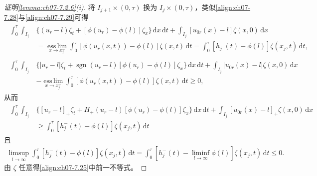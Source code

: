 \documentclass[../../main.tex]{subfiles}%
\begin{document}
\begin{proof}[证明\cref{lemma:ch07-7.2.6}(i)]
将 $I_{j+1}\times(0,\tau)$ 换为 $I_j\times(0,\tau)$，类似\eqref{align:ch07-7.28}与\eqref{align:ch07-7.29}可得
\begin{align}
\begin{aligned}
\int_0^\tau\int_{I_j}&\{(u_r-l)\zeta_t+[\phi(u_r)-\phi(l)]\zeta_x\}\,\mathrm{d}x\,\mathrm{d}t
+\int_{I_j}[u_{0r}(x)-l]\zeta(x,0)\,\mathrm{d}x\\
&=\operatorname*{ess\,lim}_{x\to x_j^-}\int_0^\tau[\phi(u_r(x,t))-\phi(l)]\zeta(x,t)\,\mathrm{d}t
=\int_0^\tau[h_j^-(t)-\phi(l)]\zeta(x_j,t)\,\mathrm{d}t,
\end{aligned} \label{align:ch07-7.30}
\end{align}
\begin{align}
\begin{aligned}
\int_0^\tau\int_{I_j}&\{|u_r-l|\zeta_t+\operatorname{sgn}(u_r-l)[\phi(u_r)-\phi(l)]\zeta_x\}\,\mathrm{d}x\,\mathrm{d}t
+\int_{I_j}|u_{0r}(x)-l|\zeta(x,0)\,\mathrm{d}x\\
&-\operatorname*{ess\,lim}_{x\to x_j^-}\int_0^\tau[\phi(u_r(x,t))-\phi(l)]\zeta(x,t)\,\mathrm{d}t\geqslant0,
\end{aligned} \label{align:ch07-7.31}
\end{align}
从而
\begin{align*}
\begin{aligned}
\int_0^\tau\int_{I_j}&\{[u_r-l]_+\zeta_t+H_+(u_r-l)[\phi(u_r)-\phi(l)]\zeta_x\}\,\mathrm{d}x\,\mathrm{d}t
+\int_{I_j}[u_{0r}(x)-l]_+\zeta(x,0)\,\mathrm{d}x\\
&\geqslant\int_0^\tau[h_j^-(t)-\phi(l)]\zeta(x_j,t)\,\mathrm{d}t
\end{aligned}
\end{align*}
且
\begin{align*}
\limsup_{l\to\infty}\int_0^\tau[h_j^-(t)-\phi(l)]\zeta(x_j,t)\,\mathrm{d}t
=\int_0^\tau\left[h_j^-(t)-\liminf_{l\to\infty}\phi(l)\right]\zeta(x_j,t)\,\mathrm{d}t\leqslant0.
\end{align*}
由 $\zeta$ 任意得\eqref{align:ch07-7.25}中前一不等式。
\end{proof}
\end{document}
